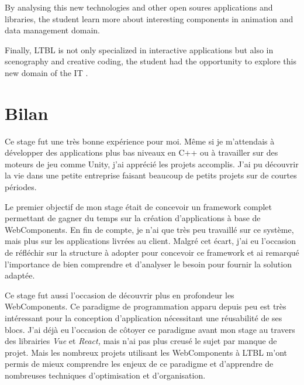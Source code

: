 \documentclass{article}
\begin{document}
    By analysing this new technologies and other open soures applications and libraries, the student learn more about interesting components in animation and data management domain.

    Finally, LTBL is not only specialized in interactive applications but also in scenography and creative coding,
    the student had the opportunity to explore this new domain of the IT .

    

    

    

    

    

    

    

    \section{Bilan}

    Ce stage fut une très bonne expérience pour moi.
    Même si je m'attendais à développer des applications plus bas niveaux en C++ ou à travailler sur des moteurs de jeu comme Unity, j'ai apprécié les projets accomplis.
    J'ai pu découvrir la vie dans une petite entreprise faisant beaucoup de petits projets sur de courtes périodes.

    Le premier objectif de mon stage était de concevoir un framework complet permettant de gagner du temps sur la création d'applications à base de WebComponents.
    En fin de compte, je n'ai que très peu travaillé sur ce système, mais plus sur les applications livrées au client.
    Malgré cet écart, j'ai eu l'occasion de réfléchir sur la structure à adopter pour concevoir ce framework et ai remarqué l'importance de bien comprendre et d'analyser le besoin pour fournir la solution adaptée.

    Ce stage fut aussi l'occasion de découvrir plus en profondeur les WebComponents.
    Ce paradigme de programmation apparu depuis peu est très intéressant pour la conception d'application nécessitant une réusabilité de ses blocs.
    J'ai déjà eu l'occasion de côtoyer ce paradigme avant mon stage au travers des librairies \emph{Vue} et \emph{React,} mais n'ai pas plus creusé le sujet par manque de projet.
    Mais les nombreux projets utilisant les WebComponents à LTBL m'ont permis de mieux comprendre les enjeux de ce paradigme et d'apprendre de nombreuses techniques d'optimisation et d'organisation.
\end{document}
